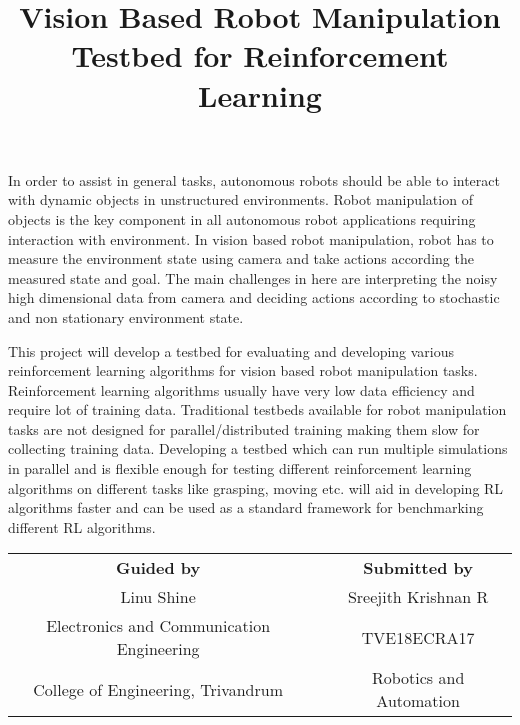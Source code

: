 \documentclass[11pt,a4paper]{article}
\title{Vision Based Robot Manipulation Testbed for Reinforcement Learning \vspace{-6ex}}
\date{}
\begin{document}
\maketitle

In order to assist in general tasks, autonomous robots should be able to interact with dynamic objects in unstructured environments. Robot manipulation of objects is the key component in all autonomous robot applications requiring interaction with environment. In vision based robot manipulation, robot has to measure the environment state using camera and take actions according the measured state and goal. The main challenges in here are interpreting the noisy high dimensional data from camera and deciding actions according to stochastic and non stationary environment state.

This project will develop a testbed for evaluating and developing various reinforcement learning algorithms for vision based robot manipulation tasks. Reinforcement learning algorithms usually have very low data efficiency and require lot of training data. Traditional testbeds available for robot manipulation tasks are not designed for parallel/distributed training making them slow for collecting training data. Developing a testbed which can run multiple simulations in parallel and is flexible enough for testing different reinforcement learning algorithms on different tasks like grasping, moving etc. will aid in developing RL algorithms faster and can be used as a standard framework for benchmarking different RL algorithms.

\vspace{10mm}

\begin{tabularx}{\textwidth}{c X c}
\textbf{Guided by} & & \textbf{Submitted by} \\
Linu Shine & & Sreejith Krishnan R \\
Electronics and Communication Engineering & & TVE18ECRA17 \\
College of Engineering, Trivandrum & & Robotics and Automation \\
\end{tabularx}
\end{document}
